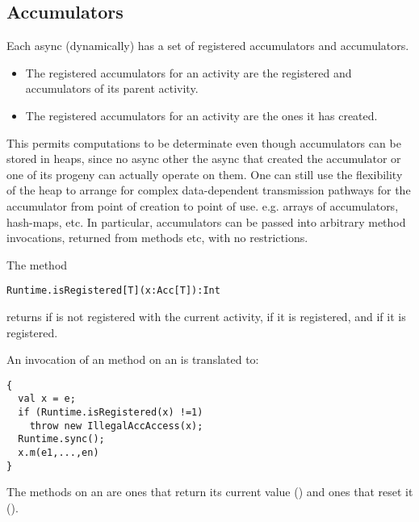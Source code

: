 \subsection{Accumulators}

Each async (dynamically) has a set of registered  accumulators
  and  accumulators.
  \begin{itemize}
  \item The registered  accumulators for an activity are
    the registered  and  accumulators of its
    parent activity.

  \item The registered  accumulators for an activity are
    the ones it has created.
  \end{itemize}

This permits computations to be determinate even though accumulators
can be stored in heaps, since no async other the async that created
the accumulator or one of its progeny can actually operate on them.
One can still use the flexibility of the heap to arrange for complex
data-dependent transmission pathways for the accumulator from point of
creation to point of use. e.g.{} arrays of accumulators, hash-maps,
etc. In particular, accumulators can be passed into arbitrary method
invocations, returned from methods etc, with no restrictions.

The method
\begin{lstlisting}
Runtime.isRegistered[T](x:Acc[T]):Int
\end{lstlisting}

\noindent returns  if  is not registered with the
current activity,  if it is  registered, and  if
it is  registered.


An invocation  of an  method on an  is
  translated to:
\begin{lstlisting}
{
  val x = e;
  if (Runtime.isRegistered(x) !=1)
    throw new IllegalAccAccess(x);
  Runtime.sync();
  x.m(e1,...,en)
}
\end{lstlisting}
The  methods on an  are ones that return its
current value () and ones that reset it ().

